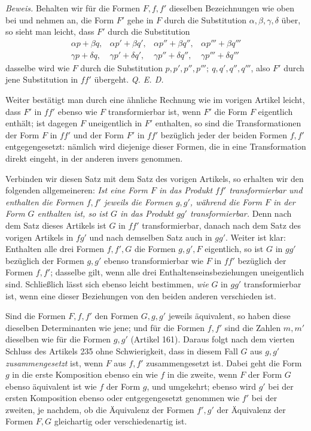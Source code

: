 \textit{Beweis.} Behalten wir für die Formen $F,f,f'$ dieselben Bezeichnungen wie oben bei und nehmen an, die Form $F'$ gehe in $F$ durch die Substitution $\alpha,\beta,\gamma,\delta$ über, so sieht man leicht, dass $F'$ durch die Substitution
\[
\begin{array}{llll}
\alpha p+\beta q,&\alpha p'+\beta q',&\alpha p''+\beta q'',&\alpha p'''+\beta q'''\\
\gamma p+\delta q,&\gamma p'+\delta q',&\gamma p''+\delta q'',&\gamma p'''+\delta q'''
\end{array}
\]
dasselbe wird wie $F$ durch die Substitution $p,p',p'',p''';\ q,q',q'',q'''$, also $F'$ durch jene Substitution in $ff'$ übergeht. \textit{Q. E. D.}

Weiter bestätigt man durch eine ähnliche Rechnung wie im vorigen Artikel leicht, dass $F'$ in $ff'$ ebenso wie $F$ transformierbar ist, wenn $F'$ die Form $F$ eigentlich enthält; ist dagegen $F$ uneigentlich in $F'$ enthalten, so sind die Transformationen der Form $F$ in $ff'$ und der Form $F'$ in $ff'$ bezüglich jeder der beiden Formen $f,f'$ entgegengesetzt: nämlich
wird diejenige dieser Formen, die in eine Transformation direkt eingeht, in der anderen invers genommen.

Verbinden wir diesen Satz mit dem Satz des vorigen Artikels, so erhalten wir den folgenden allgemeineren: \textit{Ist eine Form $F$ in das Produkt $ff'$ transformierbar und enthalten die Formen $f,f'$ jeweils die Formen $g,g'$, während die Form $F$ in der Form $G$ enthalten ist, so ist $G$ in das Produkt $gg'$ transformierbar.} Denn nach dem Satz dieses Artikels ist $G$ in $ff'$ transformierbar, danach nach dem Satz des vorigen Artikels in $fg'$ und nach demselben Satz auch in $gg'$. Weiter ist klar: Enthalten alle drei Formen $f,f',G$ die Formen $g,g',F$ eigentlich, so ist $G$ in $gg'$ bezüglich der Formen $g,g'$ ebenso transformierbar wie $F$ in $ff'$ bezüglich der Formen $f,f'$; dasselbe gilt, wenn alle drei Enthaltenseinsbeziehungen uneigentlich sind. Schließlich lässt sich ebenso leicht bestimmen, \textit{wie} $G$ in $gg'$ transformierbar ist, wenn eine dieser Beziehungen von den beiden anderen verschieden ist.

Sind die Formen $F,f,f'$ den Formen $G,g,g'$ jeweils äquivalent, so haben diese dieselben Determinanten wie jene; und für die Formen $f,f'$ sind die Zahlen $m,m'$ dieselben wie für die Formen $g,g'$ (Artikel 161). Daraus folgt nach dem vierten Schluss des Artikels 235 ohne Schwierigkeit, dass in diesem Fall $G$ aus $g,g'$ \textit{zusammengesetzt} ist, wenn $F$ aus $f,f'$ zusammengesetzt ist. Dabei geht die Form $g$ in die erste Komposition ebenso ein wie $f$ in die zweite, wenn $F$ der Form $G$ ebenso äquivalent ist wie $f$ der Form $g$, und umgekehrt; ebenso wird $g'$ bei der ersten Komposition ebenso oder entgegengesetzt genommen wie $f'$ bei der zweiten, je nachdem, ob die Äquivalenz der Formen $f',g'$ der Äquivalenz der Formen $F,G$ gleichartig oder verschiedenartig ist.

